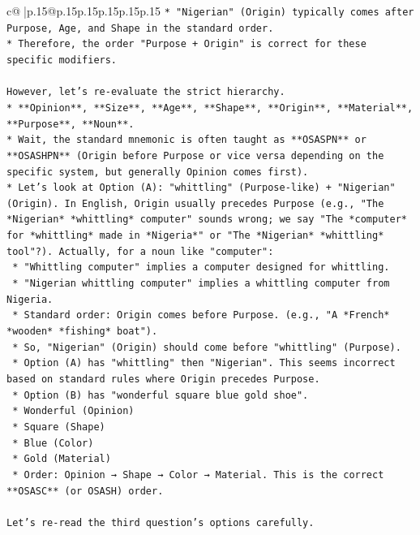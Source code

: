 \documentclass{article}
\begin{document}
{\begin{supertabular}{c@{$\;$}|p{.15\linewidth}@{}p{.15\linewidth}p{.15\linewidth}p{.15\linewidth}p{.15\linewidth}p{.15\linewidth}}
{{{\texttt{*   "Nigerian" (Origin) typically comes after Purpose, Age, and Shape in the standard order.} \\
\texttt{*   Therefore, the order "Purpose + Origin" is correct for these specific modifiers.} \\
\\ 
\texttt{However, let's re{-}evaluate the strict hierarchy.} \\
\texttt{*   **Opinion**, **Size**, **Age**, **Shape**, **Origin**, **Material**, **Purpose**, **Noun**.} \\
\texttt{*   Wait, the standard mnemonic is often taught as **OSASPN** or **OSASHPN** (Origin before Purpose or vice versa depending on the specific system, but generally Opinion comes first).} \\
\texttt{*   Let's look at Option (A): "whittling" (Purpose{-}like) + "Nigerian" (Origin). In English, Origin usually precedes Purpose (e.g., "The *Nigerian* *whittling* computer" sounds wrong; we say "The *computer* for *whittling* made in *Nigeria*" or "The *Nigerian* *whittling* tool"?). Actually, for a noun like "computer":} \\
\texttt{    *   "Whittling computer" implies a computer designed for whittling.} \\
\texttt{    *   "Nigerian whittling computer" implies a whittling computer from Nigeria.} \\
\texttt{    *   Standard order: Origin comes before Purpose. (e.g., "A *French* *wooden* *fishing* boat").} \\
\texttt{    *   So, "Nigerian" (Origin) should come before "whittling" (Purpose).} \\
\texttt{    *   Option (A) has "whittling" then "Nigerian". This seems incorrect based on standard rules where Origin precedes Purpose.} \\
\texttt{    *   Option (B) has "wonderful square blue gold shoe".} \\
\texttt{        *   Wonderful (Opinion)} \\
\texttt{        *   Square (Shape)} \\
\texttt{        *   Blue (Color)} \\
\texttt{        *   Gold (Material)} \\
\texttt{        *   Order: Opinion → Shape → Color → Material. This is the correct **OSASC** (or OSASH) order.} \\
\\ 
\texttt{Let's re{-}read the third question's options carefully.} \\
}}}
\end{supertabular}}
\end{document}
